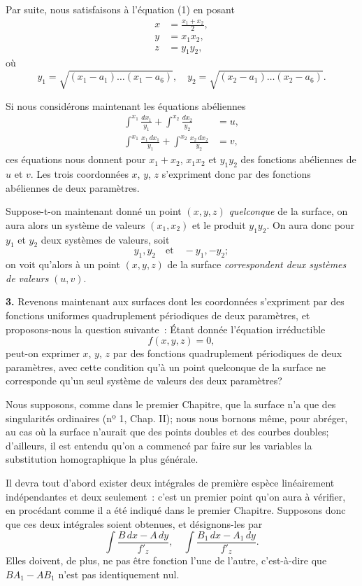 \documentclass{article}
\begin{document}
Par suite, nous satisfaisons à l'équation (1) en posant
\[
\begin{aligned}
x &= \frac{x_{1} + x_{2}}{2}, \\
y &= x_{1}x_{2}, \\
z &= y_{1}y_{2},
\end{aligned}
\]
où
\[
y_{1} = \sqrt{(x_{1} - a_{1})\ldots(x_{1} - a_{6})}, \quad y_{2} = \sqrt{(x_{2} - a_{1})\ldots(x_{2} - a_{6})}.
\]

Si nous considérons maintenant les équations abéliennes
\[
\begin{aligned}
\int^{x_{1}} \frac{dx_{1}}{y_{1}} + \int^{x_{2}} \frac{dx_{2}}{y_{2}} &= u, \\
\int^{x_{1}} \frac{x_{1}\,dx_{1}}{y_{1}} + \int^{x_{2}} \frac{x_{2}\,dx_{2}}{y_{2}} &= v,
\end{aligned}
\]
ces équations nous donnent pour $x_{1} + x_{2}$, $x_{1}x_{2}$ et $y_{1}y_{2}$ des fonctions abéliennes de $u$ et $v$. Les trois coordonnées $x$, $y$, $z$ s'expriment donc par des fonctions abéliennes de deux paramètres.

Suppose-t-on maintenant donné un point $(x, y, z)$ \emph{quelconque} de la surface, on aura alors un système de valeurs $(x_{1}, x_{2})$ et le produit $y_{1}y_{2}$. On aura donc pour $y_{1}$ et $y_{2}$ deux systèmes de valeurs, soit
\[
y_{1}, y_{2} \quad \text{et} \quad -y_{1}, -y_{2};
\]
on voit qu'alors à un point $(x, y, z)$ de la surface \emph{correspondent deux systèmes de valeurs} $(u, v)$.

\textbf{3.} Revenons maintenant aux surfaces dont les coordonnées s'expriment par des fonctions uniformes quadruplement périodiques de deux paramètres, et proposons-nous la question suivante~: Étant donnée l'équation irréductible
\[
f(x, y, z) = 0,
\]
peut-on exprimer $x$, $y$, $z$ par des fonctions quadruplement périodiques de deux paramètres, avec cette condition qu'à un point quelconque de la surface ne corresponde qu'un seul système de valeurs des deux paramètres?

Nous supposons, comme dans le premier Chapitre, que la surface n'a que des singularités ordinaires (nº 1, Chap. II); nous nous bornons même, pour abréger, au cas où la surface n'aurait que des points doubles et des courbes doubles; d'ailleurs, il est entendu qu'on a commencé par faire sur les variables la substitution homographique la plus générale.

Il devra tout d'abord exister deux intégrales de première espèce linéairement indépendantes et deux seulement~: c'est un premier point qu'on aura à vérifier, en procédant comme il a été indiqué dans le premier Chapitre. Supposons donc que ces deux intégrales soient obtenues, et désignons-les par
\[
\int \frac{B\,dx - A\,dy}{f'_{z}}, \quad \int \frac{B_{1}\,dx - A_{1}\,dy}{f'_{z}}.
\]
Elles doivent, de plus, ne pas être fonction l'une de l'autre, c'est-à-dire que $BA_{1} - AB_{1}$ n'est pas identiquement nul.
\end{document}
